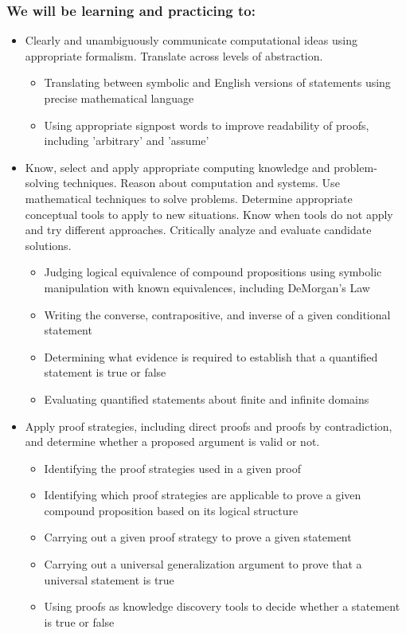 \subsubsection*{We will be learning and practicing to:}
\begin{itemize}

\item Clearly and unambiguously communicate computational ideas using appropriate formalism. Translate across levels of abstraction.
\begin{itemize}
   \item Translating between symbolic and English versions of statements using precise mathematical language
    \item Using appropriate signpost words to improve readability of proofs, including 'arbitrary' and 'assume'
\end{itemize}

\item Know, select and apply appropriate computing knowledge and problem-solving techniques. Reason about computation and systems. Use mathematical techniques to solve problems. Determine appropriate conceptual tools to apply to new situations. Know when tools do not apply and try different approaches. Critically analyze and evaluate candidate solutions.
\begin{itemize}
    \item Judging logical equivalence of compound propositions using symbolic manipulation with known equivalences, including DeMorgan's Law
    \item Writing the converse, contrapositive, and inverse of a given conditional statement
    \item Determining what evidence is required to establish that a quantified statement is true or false
    \item Evaluating quantified statements about finite and infinite domains
\end{itemize}

\item Apply proof strategies, including direct proofs and proofs by contradiction, and determine whether a proposed argument is valid or not.
\begin{itemize}
    \item Identifying the proof strategies used in a given proof
    \item Identifying which proof strategies are applicable to prove a given compound proposition based on its logical structure
    \item Carrying out a given proof strategy to prove a given statement
    \item Carrying out a universal generalization argument to prove that a universal statement is true
    \item Using proofs as knowledge discovery tools to decide whether a statement is true or false
\end{itemize}
\end{itemize}

